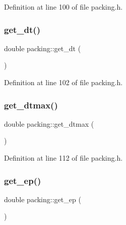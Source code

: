Definition at line 100 of file packing.\+h.

\mbox{\label{classpacking_a778812fa17eb4daa96adc03f1ce5128c}} 
\subsubsection{\texorpdfstring{get\+\_\+dt()}{get\_dt()}}
{\footnotesize\ttfamily double packing\+::get\+\_\+dt (\begin{DoxyParamCaption}{ }\end{DoxyParamCaption})\hspace{0.3cm}{\ttfamily [inline]}}



Definition at line 102 of file packing.\+h.

\mbox{\label{classpacking_a36de243c3a970bbf0840a17bf9758e61}} 
\subsubsection{\texorpdfstring{get\+\_\+dtmax()}{get\_dtmax()}}
{\footnotesize\ttfamily double packing\+::get\+\_\+dtmax (\begin{DoxyParamCaption}{ }\end{DoxyParamCaption})\hspace{0.3cm}{\ttfamily [inline]}}



Definition at line 112 of file packing.\+h.

\mbox{\label{classpacking_abe5e5105ed2b581e64f0ba5608e2ccb6}} 
\subsubsection{\texorpdfstring{get\+\_\+ep()}{get\_ep()}}
{\footnotesize\ttfamily double packing\+::get\+\_\+ep (\begin{DoxyParamCaption}{ }\end{DoxyParamCaption})\hspace{0.3cm}{\ttfamily [inline]}}



